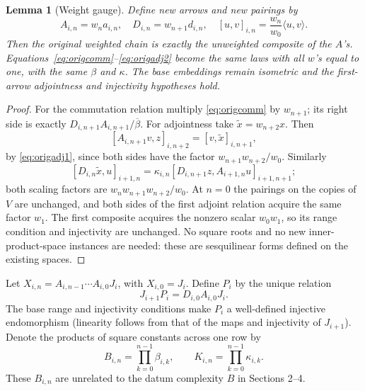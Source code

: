 \documentclass[11pt]{article}
\newtheorem{lemma}[theorem]{Lemma}
\newcommand{\inn}[2]{\langle #1,#2\rangle}
\begin{document}
\begin{lemma}[Weight gauge]\label{lem:gauge}
Define new arrows and new pairings by
\[
 A_{i,n}=w_n a_{i,n},\quad D_{i,n}=w_{n+1}d_{i,n},\quad
 [u,v]_{i,n}=\frac{w_n}{w_0}\inn{u}{v}.
\]
Then the original weighted chain is exactly the unweighted composite of the $A$'s. Equations~\eqref{eq:origcomm}--\eqref{eq:origadj2} become the same laws with all $w$'s equal to one, with the \emph{same} $\beta$ and $\kappa$. The base embeddings remain isometric and the first-arrow adjointness and injectivity hypotheses hold.
\end{lemma}
\begin{proof}
For the commutation relation multiply \eqref{eq:origcomm} by $w_{n+1}$; its right side is exactly $D_{i,n+1}A_{i,n+1}/\overline\beta$. For adjointness take $\widetilde x=w_{n+2}x$. Then
\[
 [A_{i,n+1}v,z]_{i,n+2}=[v,\widetilde x]_{i,n+1},
\]
by \eqref{eq:origadj1}, since both sides have the factor $w_{n+1}w_{n+2}/w_0$. Similarly
\[
 [D_{i,n}\widetilde x,u]_{i+1,n}
 =\kappa_{i,n}[D_{i,n+1}z,A_{i+1,n}u]_{i+1,n+1};
\]
both scaling factors are $w_n w_{n+1}w_{n+2}/w_0$. At $n=0$ the pairings on the copies of $V$ are unchanged, and both sides of the first adjoint relation acquire the same factor $w_1$. The first composite acquires the nonzero scalar $w_0w_1$, so its range condition and injectivity are unchanged. No square roots and no new inner-product-space instances are needed: these are sesquilinear forms defined on the existing spaces.
\end{proof}

Let $X_{i,n}=A_{i,n-1}\cdots A_{i,0}J_i$, with $X_{i,0}=J_i$. Define $P_i$ by the unique relation
\[
 J_{i+1}P_i=D_{i,0}A_{i,0}J_i.
\]
The base range and injectivity conditions make $P_i$ a well-defined injective endomorphism (linearity follows from that of the maps and injectivity of $J_{i+1}$). Denote the products of square constants across one row by
\[
 B_{i,n}=\prod_{k=0}^{n-1}\beta_{i,k},\qquad
 K_{i,n}=\prod_{k=0}^{n-1}\kappa_{i,k}.
\]
These $B_{i,n}$ are unrelated to the datum complexity $B$ in Sections 2--4.
\end{document}

